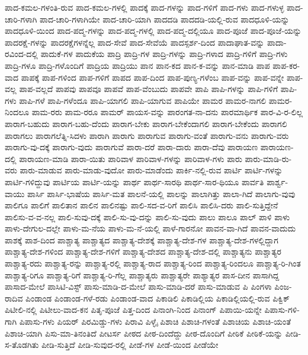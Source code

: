 {ಪಾದ-ಕಮಲ-ಗಳಂತಿ-ರುವ
ಪಾದ-ಕಮಲ-ಗಳಲ್ಲಿ
ಪಾದಕ್ಕೆ
ಪಾದ-ಗಳನ್ನು
ಪಾದ-ಗಳಿಗೆ
ಪಾದ-ಗಳು
ಪಾದ-ಗಳುಳ್ಳ
ಪಾದ-ಚಾರಿ-ಗಳಾಗಿ
ಪಾದ-ಚಾರಿ-ಗಳಾಗಿಯೇ
ಪಾದ-ಚಾರಿ-ಯಾಗಿ
ಪಾದದಡಿ
ಪಾದದಡಿ-ಯಲ್ಲಿ-ರುವ
ಪಾದಧೂಳಿ-ಯನ್ನು
ಪಾದಧೂಳಿ-ಯಿಂದ
ಪಾದ-ಪದ್ಮ-ಗಳನ್ನು
ಪಾದ-ಪದ್ಮ-ಗಳಲ್ಲಿ
ಪಾದ-ಪದ್ಮ-ದಲ್ಲಿಯೂ
ಪಾದ-ಪೂಜೆ
ಪಾದ-ಪೂಜೆ-ಯನ್ನು
ಪಾದರಕ್ಷೆ-ಗಳನ್ನು
ಪಾದರಕ್ಷೆಗಳನ್ನೆಲ್ಲ
ಪಾದ-ಸೇವೆ
ಪಾದ-ಸೇವೆಯೆ
ಪಾದಸ್ಪರ್ಶ-ದಿಂದ
ಪಾದಾಘಾತ-ವನ್ನು
ಪಾದಾ-ರವಿಂದ-ದಲ್ಲಿ
ಪಾದುಕೆ-ಗಳ
ಪಾದುಕೆಯ
ಪಾದ್ರಿ
ಪಾದ್ರಿ-ಗಳ
ಪಾದ್ರಿ-ಗಳನ್ನು
ಪಾದ್ರಿ-ಗಳಾದ
ಪಾದ್ರಿ-ಗಳಿಗೆ
ಪಾದ್ರಿ-ಗಳು
ಪಾದ್ರಿ-ಗಳೂ
ಪಾದ್ರಿ-ಗಳೊಂದಿಗೆ
ಪಾದ್ರಿಯ
ಪಾದ್ರಿಯು
ಪಾನ
ಪಾನ-ಕದ
ಪಾನ-ಕ-ವನ್ನು
ಪಾನ-ಮಾಡಿ
ಪಾಪ
ಪಾಪ-ಕರ-ವಾದ
ಪಾಪಕ್ಕೆ
ಪಾಪ-ಗಳಿಂದ
ಪಾಪ-ಗಳಿಗೆ
ಪಾಪದ
ಪಾಪ-ದಿಂದ
ಪಾಪ-ಪುಣ್ಯ-ಗಳೆಂಬ
ಪಾಪ-ವನ್ನು
ಪಾಪ-ವನ್ನೇ
ಪಾಪ-ವಲ್ಲ
ಪಾಪ-ವಲ್ಲದೆ
ಪಾಪವು
ಪಾಪವೂ
ಪಾಪವೆ
ಪಾಪ-ವೆಂಬುದು
ಪಾಪವೇ
ಪಾಪಿ
ಪಾಪಿ-ಗಳನ್ನು
ಪಾಪಿ-ಗಳಿಗೆ
ಪಾಪಿ-ಗಳು
ಪಾಪಿ-ಗಳೆ
ಪಾಪಿ-ಗಳೆಂದೂ
ಪಾಪಿ-ಯಾಗಲಿ
ಪಾಪಿ-ಯಾಗುವ
ಪಾಪಿಯೇ
ಪಾಮರ
ಪಾಮರ-ನಾಗಲಿ
ಪಾಮರ-ನಿಂದಲೂ
ಪಾಮ-ರರು
ಪಾಮ-ರರೂ
ಪಾಮರ್
ಪಾಯಸ-ವನ್ನು
ಪಾರಂಗತ-ನಾ-ದನು
ಪಾರಮಾರ್ಥಿಕ
ಪಾರ-ವಿ-ರ-ಲಿಲ್ಲ
ಪಾರಾಗ-ಬಹುದು
ಪಾರಾಗ-ಬಹು-ದೆಂದು
ಪಾರಾಗ-ಬೇಕು
ಪಾರಾಗ-ಬೇಕೆಂದಾಗಲಿ
ಪಾರಾಗ-ಬೇಕೆಂದು
ಪಾರಾಗಲಿ
ಪಾರಾಗಲು
ಪಾರಾಗಲೆತ್ನಿ-ಸಿದಳು
ಪಾರಾಗಿ
ಪಾರಾಗು
ಪಾರಾಗುವ
ಪಾರಾಗು-ವಂತೆ
ಪಾರಾಗು-ವನು
ಪಾರಾಗು-ವರು
ಪಾರಾಗು-ವು-ದಕ್ಕೆ
ಪಾರಾಗು-ವುದು
ಪಾರಾಗುವೆ
ಪಾರಾ-ದರೆ
ಪಾರಾ-ದಾರು
ಪಾರಾ-ದೆವು
ಪಾರಾಯಣ
ಪಾರಾಯಣ-ದಲ್ಲಿ
ಪಾರಾಯಣ-ಮಾಡಿ
ಪಾರಾ-ಯಿತು
ಪಾರಿವಾಳ
ಪಾರಿವಾಳ-ಗಳನ್ನು
ಪಾರಿವಾಳ-ಗಳು
ಪಾರು
ಪಾರು-ಮಾಡಿ-ರು-ವರು
ಪಾರು-ಮಾಡುವ
ಪಾರು-ಮಾಡು-ವುದೋ
ಪಾರು-ಮಾಡೆಂದು
ಪಾರ್ಕಿ-ನಲ್ಲಿ-ರುವ
ಪಾರ್ಟಿ
ಪಾರ್ಟಿ-ಗಳನ್ನು
ಪಾರ್ಟಿ-ಗಳಿದ್ದುವು
ಪಾರ್ಟಿಯ
ಪಾರ್ಟಿ-ಯನ್ನು
ಪಾರ್ಥ
ಪಾರ್ಥ-ಸಾರಥಿ
ಪಾರ್ಥ-ಸಾರ-ಥಿಯೂ
ಪಾರ್ವತಿ
ಪಾರ್ಶ್ವ-ವಾಯು
ಪಾರ್ಸಿ
ಪಾರ್ಸಿ-ಭಾಷೆಯ
ಪಾರ್ಸಿ-ಮತ
ಪಾಲನೆ-ಯಲ್ಲಿ
ಪಾಲನ್ನು
ಪಾಲಾಗಿತ್ತು
ಪಾಲಾ-ಗಿದೆ
ಪಾಲಾಗು-ವುವು
ಪಾಲಿಗೂ
ಪಾಲಿಗೆ
ಪಾಲಿತಾನ
ಪಾಲಿನ
ಪಾಲಿನಷ್ಟು
ಪಾಲಿ-ಸದ-ವ-ರಿಗೆ
ಪಾಲಿಸಿ
ಪಾಲಿಸಿ-ದರು
ಪಾಲಿ-ಸುತ್ತಿದ್ದೇನೆ
ಪಾಲಿಸು-ವ-ವ-ನಲ್ಲ
ಪಾಲಿ-ಸುವು-ದಕ್ಕೆ
ಪಾಲಿ-ಸು-ವು-ದನ್ನು
ಪಾಲಿ-ಸು-ವುದು
ಪಾಲು
ಪಾಲೂ
ಪಾಲ್
ಪಾಳಿ
ಪಾಳು
ಪಾಳು-ದೇಗುಲ-ದಲ್ಲೇ
ಪಾಳು-ಮ-ನೆಯ
ಪಾಳು-ಮ-ನೆ-ಯಲ್ಲಿ
ಪಾಳೆ-ಗಾರನೋ
ಪಾವನ-ವಾ-ಗಿದೆ
ಪಾವನ-ವಾದುದು
ಪಾಶಕ್ಕೆ
ಪಾಶ-ದಿಂದ
ಪಾಶ್ಚಾತ್ಯ
ಪಾಶ್ಚಾತ್ಯದ
ಪಾಶ್ಚಾತ್ಯ-ದೇಶಕ್ಕೆ
ಪಾಶ್ಚಾತ್ಯ-ದೇಶ-ಗಳ
ಪಾಶ್ಚಾತ್ಯ-ದೇಶ-ಗಳಲ್ಲಿದ್ದಾಗ
ಪಾಶ್ಚಾತ್ಯ-ದೇಶ-ಗಳಿಂದ
ಪಾಶ್ಚಾತ್ಯ-ದೇಶ-ಗಳಿಗೆ
ಪಾಶ್ಚಾತ್ಯ-ದೇಶದ
ಪಾಶ್ಚಾತ್ಯ-ದೇಶ-ದಲ್ಲಿ
ಪಾಶ್ಚಾತ್ಯನು
ಪಾಶ್ಚಾತ್ಯರ
ಪಾಶ್ಚಾತ್ಯ-ರದು
ಪಾಶ್ಚಾತ್ಯ-ರನ್ನು
ಪಾಶ್ಚಾತ್ಯ-ರಲ್ಲಿ
ಪಾಶ್ಚಾತ್ಯ-ರಾದ
ಪಾಶ್ಚಾತ್ಯ-ರಿಂದ
ಪಾಶ್ಚಾತ್ಯ-ರಿಂದಲೂ
ಪಾಶ್ಚಾತ್ಯ-ರಿ-ಗಿಂತ
ಪಾಶ್ಚಾತ್ಯ-ರಿಗೂ
ಪಾಶ್ಚಾತ್ಯ-ರಿಗೆ
ಪಾಶ್ಚಾತ್ಯ-ರಿ-ಗೆಲ್ಲ
ಪಾಶ್ಚಾತ್ಯರು
ಪಾಶ್ಚಾತ್ಯರೇ
ಪಾಶ್ಯಾತ್ಯರ
ಪಾಸ-ದೀನ
ಪಾಸಾಗಿದ್ದ
ಪಾಸಾದ-ಮೇಲೆ
ಪಾಸಿಟಿ-ವಿಸ್ಟ್
ಪಾಸು-ಮಾಡಿ-ದ-ಮೇಲೆ
ಪಾಸು-ಮಾಡಿ-ದರೆ
ಪಾಸು-ಮಾಡುವ
ಪಿ
ಪಿಂಗಳಾ
ಪಿಂಜ-ರಾದಿವ
ಪಿಂಡಾಂಡ
ಪಿಂಡಾಂಡ-ಗಳೆ-ರಡು
ಪಿಂಡಾಂಡ-ವಾದ
ಪಿಕಾಡಿಲಿ
ಪಿಕಾಡಿಲ್ಲಿಯ
ಪಿಕಾಡಿಲ್ಲಿಯಲ್ಲಿ-ರುವ
ಪಿಕ್ವಿಕ್
ಪಿಟೀಲಿ-ನಲ್ಲಿ
ಪಿಟೀಲು-ವಾದ-ಕನ
ಪಿತೃ-ಪೂಜೆ
ಪಿತ್ತ-ದಿಂದ
ಪಿನಾಂಗಿ-ನಿಂದ
ಪಿನಾಂಗ್
ಪಿಪಾಯಿ-ಯನ್ನೇ
ಪಿಪಾಸು-ಗಳಿ-ಗಾಗಿ
ಪಿಪಾಸು-ಗಳು
ಪಿಯರ್
ಪಿರಮಿಡ್ಡು-ಗಳು
ಪಿರಾವಿ
ಪಿಳ್ಳೈ
ಪಿಶಾಚಿ
ಪಿಶಾಚಿ-ಗಳಂತೆ
ಪಿಶಾಚಿಯ
ಪಿಶಾಚಿ-ಯಂತೆ
ಪಿಶಾಚಿ-ಯಾಗಿ
ಪಿಸು-ಮಾ-ತಿನಂತಿದೆ
ಪೀಟರ್ಸ
ಪೀಠದ
ಪೀಠ-ದಿಂದೆದ್ದು
ಪೀಠ-ದೊಂದಿಗೆ
ಪೀಠಿಕೆ
ಪೀಠಿಕೆ-ಯನ್ನು
ಪೀಡಿ-ಸ-ತೊಡಗಿತು
ಪೀಡಿ-ಸುತ್ತಿದೆ
ಪೀಡಿ-ಸುವುದ-ರಲ್ಲಿ
ಪೀಡೆ-ಗಳ
ಪೀಡೆ-ಯಿಂದ
ಪೀಡೆಯೇ
}
